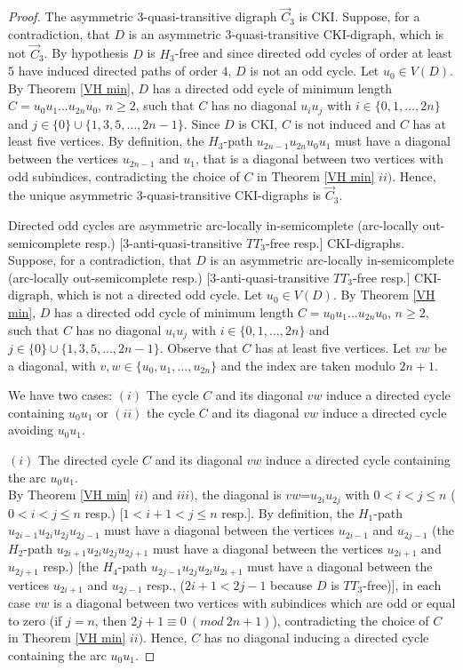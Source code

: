 \begin{proof}
The asymmetric $3$-quasi-transitive digraph $\overrightarrow{C}_3$ is CKI.
%
Suppose, for a contradiction, that  $D$ is an asymmetric $3$-quasi-transitive CKI-digraph, which is not $\overrightarrow{C}_3$.
By hypothesis $D$ is $H_3$-free and since directed odd cycles of order at least $5$ have induced directed paths of order $4$, $D$ is not an odd cycle. 
Let $u_0\in V(D)$. By Theorem \ref{VH min}, $D$ has a directed odd cycle of minimum length $C=u_0u_1\dots u_{2n}u_0$, $n\ge2$, such that $C$ has no diagonal $u_i u_j$ with $i\in\{0,1,\dots,2n\}$ and $j\in\{0\}\cup\{1,3,5,\dots,2n-1\}$.
Since $D$ is CKI, $C$ is not induced and $C$ has at least five vertices. By definition, the $H_3$-path $u_{2n-1}u_{2n}u_0u_1$ must have a diagonal between  the vertices $u_{2n-1}$ and $u_1$, that is a diagonal between two vertices with odd subindices, contradicting the choice of $C$ in Theorem \ref{VH min} $ii)$. Hence, the unique asymmetric $3$-quasi-transitive CKI-digraphs is $\overrightarrow{C}_3$.

Directed odd cycles are asymmetric arc-locally in-semicomplete (arc-locally out-semicomplete resp.) [$3$-anti-quasi-transitive $TT_3$-free resp.] CKI-digraphs.
%
Suppose, for a contradiction, that $D$ is an asymmetric arc-locally in-semicomplete (arc-locally out-semicomplete resp.) [$3$-anti-quasi-transitive $TT_3$-free resp.]  CKI-digraph, which is not a directed odd cycle. Let $u_0\in V(D)$. By Theorem \ref{VH min}, $D$ has a directed odd cycle of minimum length $C=u_0u_1\dots u_{2n}u_0$, $n\ge2$, such that $C$ has no diagonal $u_i u_j$ with $i\in\{0,1,\dots,2n\}$ and $j\in\{0\}\cup\{1,3,5,\dots,2n-1\}$. Observe that $C$ has at least five vertices. Let  $vw$ be a diagonal, with $v,w\in \{u_0,u_1,\dots, u_{2n}\}$ and the index are taken modulo $2n+1$.

We have two cases: $(i)$ The cycle $C$ and its diagonal $vw$ induce a directed cycle containing $u_0u_1$ or $(ii)$ the cycle $C$ and its diagonal $vw$ induce a directed cycle avoiding  $u_0u_1$.

$(i)$ The directed cycle $C$ and its diagonal $vw$ induce a directed cycle containing the arc $u_0u_1$. \\
By Theorem \ref{VH min} $ii)$ and $iii)$, the diagonal is $vw$=$u_{2i}u_{2j}$ with $0< i<j\le n$ ($0< i<j\le n$ resp.) [$1< i+1<j\le n$ resp.]. By definition, the $H_1$-path $u_{2i-1}u_{2i}u_{2j}u_{2j-1}$ must have a diagonal between the vertices  $u_{2i-1}$ and $u_{2j-1}$ (the $H_2$-path $u_{2i+1}u_{2i}u_{2j}u_{2j+1}$ must have a diagonal between the vertices  $u_{2i+1}$ and $u_{2j+1}$ resp.) [the $H_4$-path $u_{2j-1}u_{2j}u_{2i}u_{2i+1}$ must have a diagonal between the vertices  $u_{2i+1}$ and $u_{2j-1}$ resp., ($2i+1<2j-1$ because $D$ is $TT_3$-free)], in each case $vw$ is a diagonal between two vertices with  subindices which are odd or equal to zero (if $j=n$, then $2j+1\equiv 0~(mod~ 2n+1)$), contradicting the choice of $C$ in Theorem \ref{VH min} $ii)$. Hence, $C$ has no diagonal inducing a directed cycle containing the arc $u_0u_1$.


\end{proof}
